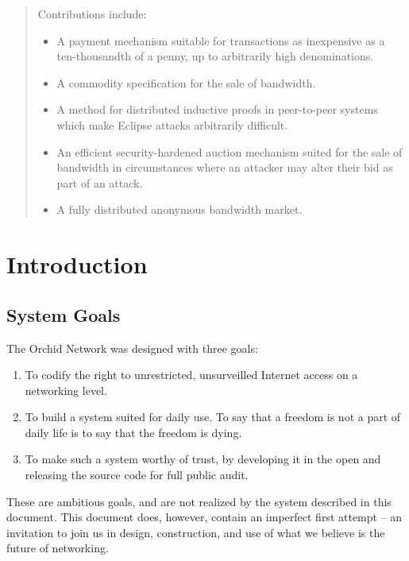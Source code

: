 \documentclass{article}
\newcommand{\mesh}{Orchid}
\begin{document}
\begin{abstract}
  Contributions include:

  \begin{itemize}
  \item A payment mechanism suitable for transactions as inexpensive
    as a ten-thousandth of a penny, up to arbitrarily high
    denominations.
  \item A commodity specification for the sale of bandwidth.
  \item A method for distributed inductive proofs in peer-to-peer
    systems which make Eclipse attacks arbitrarily difficult.
  \item An efficient security-hardened auction mechanism suited for
    the sale of bandwidth in circumstances where an attacker may alter
    their bid as part of an attack.
  \item A fully distributed anonymous bandwidth market.
  \end{itemize}

\end{abstract}


\newpage
\tableofcontents
\newpage


\section{Introduction}
\label{sec:overview}

\subsection{System Goals}

The \mesh{} Network was designed with three goals:

\begin{enumerate}
\item To codify the right to unrestricted, unsurveilled Internet access on a networking level.
\item To build a system suited for daily use. To say that a freedom is not a part of daily life is to say that the freedom is dying.
\item To make such a system worthy of trust, by developing it in the open and releasing the source code for full public audit.
\end{enumerate}

These are ambitious goals, and are not realized by the system described in this document. This document does, however, contain an imperfect first attempt – an invitation to join us in design, construction, and use of what we believe is the future of networking.
\end{document}
